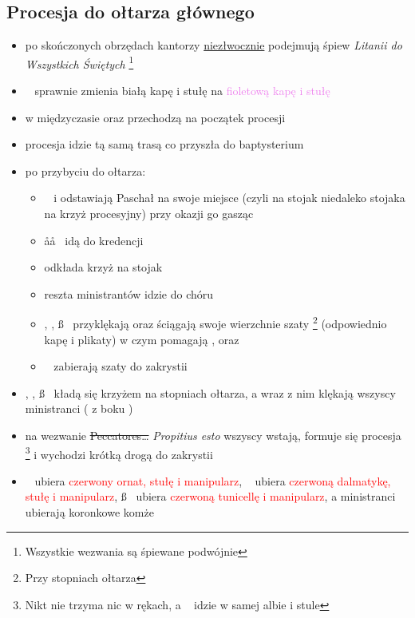 \subsection{Procesja do ołtarza głównego}
\begin{itemize}
	\item po skończonych obrzędach kantorzy \underline{niezłwocznie} podejmują
	      śpiew \textit{Litanii do Wszystkich Świętych} \footnote{Wszystkie
		      wezwania są śpiewane podwójnie}
	\item \ii~ sprawnie zmienia \textcolor{black!50}{białą kapę i stułę} na
	      \textcolor{violet}{fioletową kapę i stułę}
	\item w międzyczasie \paschal oraz  przechodzą na początek procesji
	\item procesja idzie tą samą trasą co przyszła do baptysterium
	\item po przybyciu do ołtarza:
	      \begin{itemize}
		      \item \paschal~ i  odstawiają Paschał na swoje miejsce (czyli
		            na stojak niedaleko stojaka na krzyż procesyjny) przy okazji
		            go gasząc
		      \item \aa\aa~ idą do kredencji
		      \item {} odkłada krzyż na stojak
		      \item reszta ministrantów idzie do chóru
		      \item \ii, \dd, \ss~ przyklękają oraz ściągają swoje wierzchnie
		            szaty \footnote{Przy stopniach ołtarza} (odpowiednio kapę i
		            plikaty) w czym pomagają ,  oraz \zz\zz
		      \item \zz\zz~ zabierają szaty do zakrystii
	      \end{itemize}
	\item \ii, \dd, \ss~ kładą się krzyżem na stopniach ołtarza, a wraz z nim
	      klękają wszyscy ministranci ( z boku \dd)
	\item na wezwanie \sout{Peccatores\dots} \textit{Propitius esto} wszyscy
	      wstają, formuje się procesja \footnote{Nikt nie trzyma nic w rękach, a
		      \ii~ idzie w samej albie i stule} i wychodzi krótką drogą do zakrystii
	\item \ii~ ubiera \textcolor{red}{czerwony ornat, stułę i manipularz}, \dd~
	      ubiera \textcolor{red}{czerwoną dalmatykę, stułę i manipularz},
	      \ss~ ubiera \textcolor{red}{czerwoną tunicellę i manipularz}, a
	      ministranci ubierają koronkowe komże
\end{itemize}
